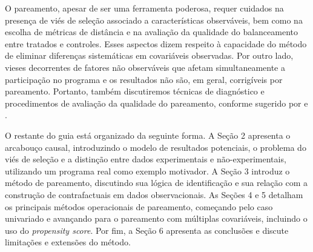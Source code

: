 O pareamento, apesar de ser uma ferramenta poderosa, requer cuidados na presença de viés de seleção associado a características observáveis, bem como na escolha de métricas de distância e na avaliação da qualidade do balanceamento entre tratados e controles. Esses aspectos dizem respeito à capacidade do método de eliminar diferenças sistemáticas em covariáveis observadas. Por outro lado, vieses decorrentes de fatores não observáveis que afetam simultaneamente a participação no programa e os resultados não são, em geral, corrigíveis por pareamento. Portanto, também discutiremos técnicas de diagnóstico e procedimentos de avaliação da qualidade do pareamento, conforme sugerido por \cite{abadie2006large} e \cite{imbens2004nonparametric}.

O restante do guia está organizado da seguinte forma. A Seção 2 apresenta o arcabouço causal, introduzindo o modelo de resultados potenciais, o problema do viés de seleção e a distinção entre dados experimentais e não-experimentais, utilizando um programa real como exemplo motivador. A Seção 3 introduz o método de pareamento, discutindo sua lógica de identificação e sua relação com a construção de contrafactuais em dados observacionais. As Seções 4 e 5 detalham os principais métodos operacionais de pareamento, começando pelo caso univariado e avançando para o pareamento com múltiplas covariáveis, incluindo o uso do \textit{propensity score}. Por fim, a Seção 6 apresenta as conclusões e discute limitações e extensões do método.